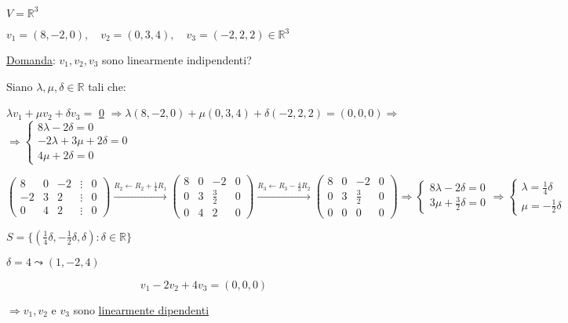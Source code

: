 \documentclass{article}
\newcommand{\ul}[1]{\underline{#1}}
\newcommand{\R}{\mathbb{R}}
\begin{document}
$V=\R^3$

$v_1=(8,-2,0),\quad v_2=(0,3,4),\quad v_3=(-2,2,2)\in\R^3$

	\ul{Domanda}: $v_1,v_2,v_3$ sono linearmente indipendenti?

	Siano $\lambda,\mu,\delta\in\R$ tali che:

$\lambda v_1+\mu v_2+\delta v_3=$ \ul{0} $\Rightarrow\lambda(8,-2,0)+\mu(0,3,4)+\delta(-2,2,2)=(0,0,0)\Rightarrow$
$\Rightarrow
\begin{cases}
	8\lambda-2\delta=0       \\
	-2\lambda+3\mu+2\delta=0 \\
	4\mu+2\delta=0
\end{cases}$

$\begin{pmatrix}
	8  & 0 & -2 & \vdots & 0 \\
	-2 & 3 & 2  & \vdots & 0 \\
	0  & 4 & 2  & \vdots & 0
\end{pmatrix}\xrightarrow{R_2\leftarrow R_2+\frac{1}{4}R_1}
\begin{pmatrix}
	8 & 0 & -2          & 0 \\
	0 & 3 & \frac{3}{2} & 0 \\
	0 & 4 & 2           & 0
\end{pmatrix}\xrightarrow{R_3\leftarrow R_3-\frac{4}{3}R_2}
\begin{pmatrix}
	8 & 0 & -2          & 0 \\
	0 & 3 & \frac{3}{2} & 0 \\
	0 & 0 & 0           & 0
\end{pmatrix}\Rightarrow
\begin{cases}
	8\lambda-2\delta=0 \\
	3\mu+\frac{3}{2}\delta=0
\end{cases}\Rightarrow
\begin{cases}
	\lambda=\frac{1}{4}\delta \\
	\mu=-\frac{1}{2}\delta
\end{cases}$

$S=\{(\frac{1}{4}\delta,-\frac{1}{2}\delta,\delta):\delta\in\R\}$

$\delta=4\leadsto(1,-2,4)$

	$$v_1-2v_2+4v_3=(0,0,0)$$

$\Rightarrow v_1,v_2$ e $v_3$ sono \ul{linearmente dipendenti}
\end{document}
